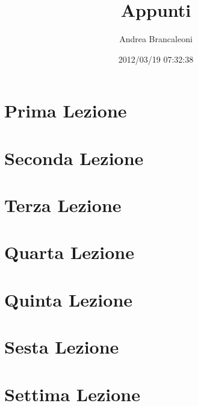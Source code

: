 \documentclass[a5paper]{book}
\author{Andrea Brancaleoni}
\title{Appunti}
\date{2012/03/19 07:32:38}
\begin{document}
  \maketitle

  \chapter{Prima Lezione}
    
  \chapter{Seconda Lezione}
    
  \chapter{Terza Lezione}
    
  \chapter{Quarta Lezione}
    
  \chapter{Quinta Lezione}
    
  \chapter{Sesta Lezione}
    
  \chapter{Settima Lezione}
    
\end{document}
